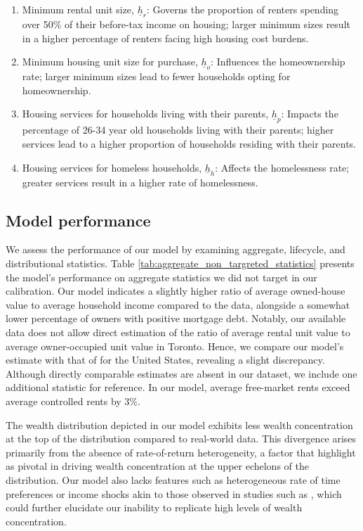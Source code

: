 \documentclass[parskip=full]{article}
\begin{document}
\begin{enumerate}
    \item Minimum rental unit size, $\underline{h}_{r}$: Governs the proportion of renters spending over 50\% of their before-tax income on housing; larger minimum sizes result in a higher percentage of renters facing high housing cost burdens.
    \item Minimum housing unit size for purchase, $\underline{h}_{o}$: Influences the homeownership rate; larger minimum sizes lead to fewer households opting for homeownership.
    \item Housing services for households living with their parents, $\underline{h}_{p}$: Impacts the percentage of 26-34 year old households living with their parents; higher services lead to a higher proportion of households residing with their parents.
    \item Housing services for homeless households, $\underline{h}_{h}$: Affects the homelessness rate; greater services result in a higher rate of homelessness.
\end{enumerate}

\subsection{Model performance}\label{subsection:non_targeted_statistics}

We assess the performance of our model by examining aggregate, lifecycle, and distributional statistics. Table \ref{tab:aggregate_non_targreted_statistics} presents the model's performance on aggregate statistics we did not target in our calibration. Our model indicates a slightly higher ratio of average owned-house value to average household income compared to the data, alongside a somewhat lower percentage of owners with positive mortgage debt. Notably, our available data does not allow direct estimation of the ratio of average rental unit value to average owner-occupied unit value in Toronto. Hence, we compare our model's estimate with that of \citet{chatterjee-eyigungor-2015} for the United States, revealing a slight discrepancy. Although directly comparable estimates are absent in our dataset, we include one additional statistic for reference. In our model, average free-market rents exceed average controlled rents by 3\%. %

The wealth distribution depicted in our model exhibits less wealth concentration at the top of the distribution compared to real-world data. This divergence arises primarily from the absence of rate-of-return heterogeneity, a factor that \citet{fagereng} highlight as pivotal in driving wealth concentration at the upper echelons of the distribution. Our model also lacks features such as heterogeneous rate of time preferences \citep{ks-1998} or income shocks akin to those observed in studies such as \citet{mj-shocks}, which could further elucidate our inability to replicate high levels of wealth concentration.
\end{document}
